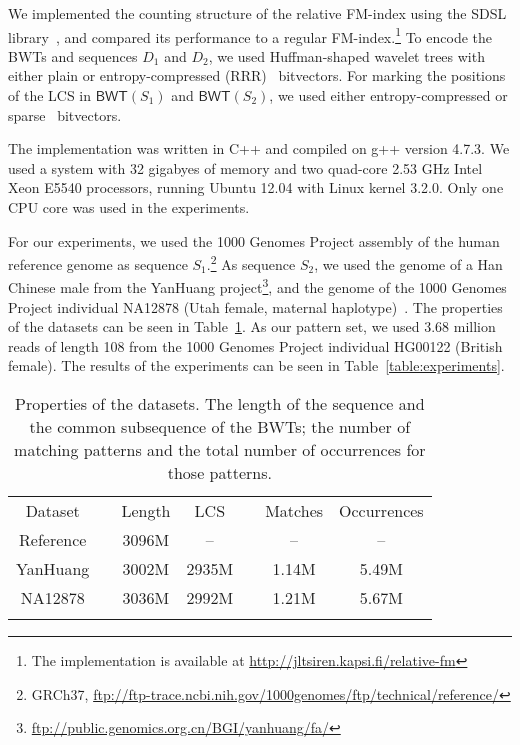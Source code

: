 \documentclass{llncs}
\newcommand{\BWT}
  {\ensuremath{\mathsf{BWT}}}
\begin{document}
We implemented the counting structure of the relative FM-index using the SDSL
library~\cite{Gog2014b}, and compared its performance to a regular
FM-index.\footnote{The implementation is available at
\url{http://jltsiren.kapsi.fi/relative-fm}}
To encode the BWTs and sequences $D_{1}$ and $D_{2}$, we used Huffman-shaped
wavelet trees with either plain or entropy-compressed (RRR)~\cite{Raman2007}
bitvectors. For marking the positions of the LCS in $\BWT(S_{1})$ and $\BWT(S_{2})$, we used either entropy-compressed or sparse~\cite{Okanohara2007} bitvectors.

The implementation was written in C++ and compiled on g++ version 4.7.3. We
used a system with 32 gigabyes of memory and two quad-core 2.53 GHz Intel
Xeon E5540 processors, running Ubuntu 12.04 with Linux kernel 3.2.0. Only one
CPU core was used in the experiments.

For our experiments, we used the 1000 Genomes Project assembly of the human
reference genome as sequence $S_{1}$.\footnote{GRCh37,
\url{ftp://ftp-trace.ncbi.nih.gov/1000genomes/ftp/technical/reference/}} As
sequence $S_{2}$, we used the genome of a Han Chinese male from the YanHuang
project\footnote{\url{ftp://public.genomics.org.cn/BGI/yanhuang/fa/}}, and
the genome of the 1000 Genomes Project individual NA12878 (Utah female,
maternal haplotype)~\cite{Rozowsky2011}. The properties of the datasets can
be seen in Table~\ref{table:datasets}. As our pattern set, we used 3.68
million reads of length 108 from the 1000 Genomes Project individual HG00122
(British female). The results of the experiments can be seen in
Table~\ref{table:experiments}.

\begin{table}[t]
\centering
\caption{Properties of the datasets. The length of the sequence and the common subsequence of the BWTs; the number of matching patterns and the total number of occurrences for those patterns.}\label{table:datasets}
\begin{tabular}{ccccccc}
\hline
\noalign{\smallskip}
Dataset   & \phantom{00} & Length &   LCS & \phantom{00} & Matches & Occurrences \\
\noalign{\smallskip}
\hline
\noalign{\smallskip}
Reference &              &  3096M &    -- &              &      -- & -- \\
YanHuang  &              &  3002M & 2935M &              &   1.14M & 5.49M \\
NA12878   &              &  3036M & 2992M &              &   1.21M & 5.67M \\
\noalign{\smallskip}
\hline
\end{tabular}
\end{table}
\end{document}
